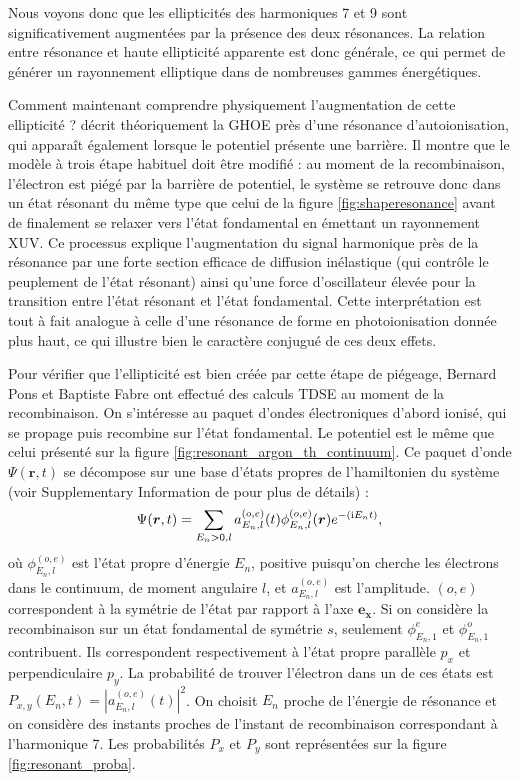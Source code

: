 Nous voyons donc que les ellipticités des harmoniques 7 et 9 sont significativement augmentées par la présence des deux résonances. La relation entre résonance et haute ellipticité apparente est donc générale, ce qui permet de générer un rayonnement elliptique dans de nombreuses gammes énergétiques. 

Comment maintenant comprendre physiquement l'augmentation de cette ellipticité ?  décrit théoriquement la GHOE près d'une résonance d'autoionisation, qui apparaît également lorsque le potentiel présente une barrière. Il montre que le modèle à trois étape habituel doit être modifié : au moment de la recombinaison, l'électron est piégé par la barrière de potentiel, le système se retrouve donc dans un état résonant du même type que celui de la figure \ref{fig:shaperesonance} avant de finalement se relaxer vers l'état fondamental en émettant un rayonnement XUV. Ce processus explique l'augmentation du signal harmonique près de la résonance par une forte section efficace de diffusion inélastique (qui contrôle le peuplement de l'état résonant) ainsi qu'une force d'oscillateur élevée pour la transition entre l'état résonant et l'état fondamental.
Cette interprétation est tout à fait analogue à celle d'une résonance de forme en photoionisation donnée plus haut, ce qui illustre bien le caractère conjugué de ces deux effets.

Pour vérifier que l'ellipticité est bien créée par cette étape de piégeage, Bernard Pons et Baptiste Fabre ont effectué des calculs TDSE au moment de la recombinaison. On s'intéresse au paquet d'ondes électroniques d'abord ionisé, qui se propage puis recombine sur l'état fondamental. Le potentiel est le même que celui présenté sur la figure \ref{fig:resonant_argon_th_continuum}. Ce paquet d'onde $\Psi(\bm{r},t)$ se décompose sur une base d'états propres de l'hamiltonien du système (voir Supplementary Information de  pour plus de détails) :
\begin{equation}
\Psi(\bm{r},t)=\sum_{E_n>0,l} a_{E_n,l}^{(o,e)}(t)\phi_{E_n,l}^{(o,e)}(\bm{r})e^{-(\mathrm{i} E_n t)},
\end{equation}
où $\phi_{E_n,l}^{(o,e)}$ est l'état propre d'énergie $E_n$, positive puisqu'on cherche les électrons dans le continuum, de moment angulaire $l$, et $a_{E_n,l}^{(o,e)}$ est l'amplitude. $(o,e)$ correspondent à la symétrie de l'état par rapport à l'axe $\bm{e_x}$. Si on considère la recombinaison sur un état fondamental de symétrie $s$, seulement $\phi_{E_n,1}^{e}$ et $\phi_{E_n,1}^{o}$ contribuent. Ils correspondent respectivement à l'état propre parallèle $p_x$ et perpendiculaire $p_y$. La probabilité de trouver l'électron dans un de ces états est $P_{x,y}(E_n,t) = |a_{E_n,l}^{(o,e)}(t)|^2$. On choisit $E_n$ proche de l'énergie de résonance et on considère des instants proches de l'instant de recombinaison correspondant à l'harmonique 7. Les probabilités $P_x$ et $P_y$ sont représentées sur la figure \ref{fig:resonant_proba}.

